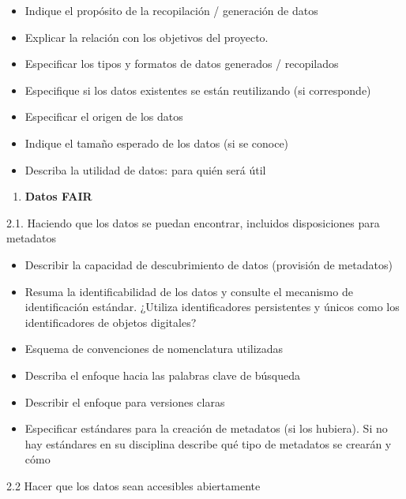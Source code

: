 \documentclass[
  14pt,
]{book}
\providecommand{\tightlist}{%
  \setlength{\itemsep}{0pt}\setlength{\parskip}{0pt}}
\begin{document}
\begin{itemize}
\tightlist
\item
  Indique el propósito de la recopilación / generación de datos
\item
  Explicar la relación con los objetivos del proyecto.
\item
  Especificar los tipos y formatos de datos generados / recopilados
\item
  Especifique si los datos existentes se están reutilizando (si corresponde)
\item
  Especificar el origen de los datos
\item
  Indique el tamaño esperado de los datos (si se conoce)
\item
  Describa la utilidad de datos: para quién será útil
\end{itemize}

\begin{enumerate}
\def\labelenumi{\arabic{enumi}.}
\setcounter{enumi}{1}
\tightlist
\item
  \textbf{Datos FAIR}
\end{enumerate}

2.1. Haciendo que los datos se puedan encontrar, incluidos
disposiciones para metadatos

\begin{itemize}
\tightlist
\item
  Describir la capacidad de descubrimiento de datos (provisión de metadatos)
\item
  Resuma la identificabilidad de los datos y consulte el mecanismo de identificación estándar. ¿Utiliza identificadores persistentes y únicos como los identificadores de objetos digitales?
\item
  Esquema de convenciones de nomenclatura utilizadas
\item
  Describa el enfoque hacia las palabras clave de búsqueda
\item
  Describir el enfoque para versiones claras
\item
  Especificar estándares para la creación de metadatos (si los hubiera). Si no hay estándares en su
  disciplina describe qué tipo de metadatos se crearán y cómo
\end{itemize}

2.2 Hacer que los datos sean accesibles abiertamente
\end{document}
